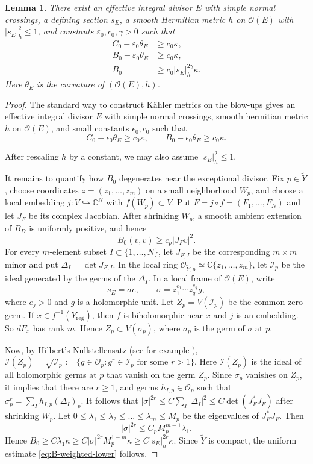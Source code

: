 \documentclass[reqno]{amsart}
\newcommand{\C}{\mathbb{C}}
\newcommand{\reg}{\mathrm{reg}}
\newcommand{\cI}{\mathcal I}
\newcommand{\cO}{\mathcal O}
\theoremstyle{plain}
\newtheorem{lemma}[thm]{Lemma}
\theoremstyle{remark}
\begin{document}
\begin{lemma}
There exist an effective integral divisor $E$ with simple normal crossings, a defining section
$s_E$, a smooth Hermitian metric $h$ on $\cO(E)$ with
$|s_E|_h^2\leq1$, and constants $\varepsilon_0,c_0,\gamma>0$ such that
\begin{align}
 C_0-\varepsilon_0\theta_{E}&\geq c_0\kappa,
 \label{eq:C-exceptional-positive}\\
 B_0-\varepsilon_0\theta_{E}&\geq c_0\kappa,
 \label{eq:B-exceptional-positive}\\
 B_0&\geq c_0|s_E|_{h}^{2\gamma}\kappa.
 \label{eq:B-weighted-lower}
\end{align}
Here $\theta_E$ is the curvature of
$(\cO(E),h)$.
\end{lemma}
\begin{proof}
The standard way to construct K\"ahler metrics on the blow-ups gives an effective integral divisor $E$ with simple normal crossings, smooth hermitian metric $h$ on $\cO(E)$, and small constants $\epsilon_0,c_0$ such that \[
    C_0-\epsilon_0\theta_{E}\geq c_0\kappa,\qquad B_0-\epsilon_0\theta_E\geq c_0 \kappa.
    \]

After rescaling $h$ by a constant, we may also assume
$|s_E|_h^2\leq1$.

It remains to quantify how $B_0$ degenerates near the exceptional
divisor. Fix $p\in\widetilde Y$, choose coordinates
$z=(z_1,\ldots,z_m)$ on a small neighborhood $W_p$, and choose a
local embedding $j:V\hookrightarrow\C^N$ with $f(W_p)\subset V$. Put
$F=j\circ f=(F_1,\ldots,F_N)$ and let $J_F$ be its complex Jacobian.
After shrinking $W_p$, a smooth ambient extension of $B_D$ is uniformly
positive, and hence
\[
 B_0(v,v)\geq c_p|J_Fv|^2.
\]
For every $m$-element subset $I\subset\{1,\ldots,N\}$, let
$J_{F,I}$ be the corresponding $m\times m$ minor and put
$\Delta_I=\det J_{F,I}$. In the local ring
$\cO_{\widetilde Y,p}\simeq\C\{z_1,\ldots,z_m\}$, let $\cI_p$ be the
ideal generated by the germs of the $\Delta_I$. In a local frame of
$\cO(E)$, write
\[
 s_E=\sigma e,
 \qquad
 \sigma=z_1^{e_1}\cdots z_q^{e_q}g,
\]
where $e_j>0$ and $g$ is a holomorphic unit. Let $Z_p=V(\cI_p)$ be the common zero germ. If $x\in f^{-1}(Y_\reg)$, then $f$ is biholomorphic near $x$ and $j$ is an embedding. So $dF_x$ has rank $m$. Hence $Z_p\subset V(\sigma_p)$, where $\sigma_p$ is the germ of $\sigma$ at $p$.

Now, by Hilbert's Nullstellensatz (see for example \cite[Chapter II, Theorem 4.22]{D12}), $\cI(Z_p)=\sqrt{\cI_p}:=\{g\in \cO_p:g^r\in \cI_p \text{ for some }r>1\}$. Here $\cI(Z_p)$ is the ideal of all holomorphic germs at $p$ that vanish on the germ $Z_p$. Since $\sigma_p$ vanishes on $Z_p$, it implies that there are $r\geq 1$, and germs $h_{I,p}\in \cO_p$ such that $\sigma_p^r=\sum_{I}h_{I,p}(\Delta_{I})_p$. 
It follows that $|\sigma|^{2r}\leq C\sum_{I}|\Delta_I|^2\leq C\det(J_F^*J_F)$ after shrinking $W_p$. Let $0\leq \lambda_1\leq \lambda_2\leq ...\leq \lambda_m\leq M_p$ be the eigenvalues of $J_F^*J_F$. Then \[
|\sigma|^{2r}\leq C_pM_p^{m-1}\lambda_1.
\]
Hence $B_0\geq C\lambda_1\kappa\geq C|\sigma|^{2r}M_p^{1-m}\kappa\geq C|s_E|_h^{2r}\kappa$. Since $\tilde{Y}$ is compact, the uniform estimate \eqref{eq:B-weighted-lower} follows. 


\end{proof}
\end{document}
